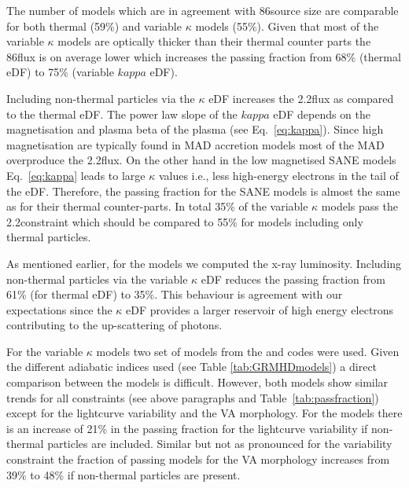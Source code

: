 
The number of models which are in agreement with 86\GHz source size are comparable for both thermal (59\%) and variable $\kappa$ models (55\%).
Given that most of the variable $\kappa$ models are optically thicker than their thermal counter parts the 86\GHz flux is on average lower which increases the passing fraction from 68\% (thermal eDF) to 75\% (variable $kappa$ eDF).


Including non-thermal particles via the $\kappa$ eDF increases the 2.2\um flux as compared to the thermal eDF.
The power law slope of the $kappa$ eDF depends on the magnetisation and plasma beta of the plasma (see Eq.~\ref{eq:kappa}).
Since high magnetisation are typically found in MAD accretion models most of the MAD overproduce the 2.2\um flux.
On the other hand in the low magnetised SANE models Eq.~\ref{eq:kappa} leads to large $\kappa$ values i.e., less high-energy electrons in the tail of the eDF.
Therefore, the passing fraction for the SANE models is almost the same as for their thermal counter-parts.
In total 35\% of the variable $\kappa$ models pass the 2.2\um constraint which should be compared to 55\% for models including only thermal particles.


As mentioned earlier, for the \hamr models we computed the x-ray luminosity.
Including non-thermal particles via the variable $\kappa$ eDF reduces the passing fraction from 61\% (for thermal eDF) to 35\%.
This behaviour is agreement with our expectations since the $\kappa$ eDF provides a larger reservoir of high energy electrons contributing to the up-scattering of photons.


For the variable $\kappa$ models two set of models from the \bhac and \hamr codes were used.
Given the different adiabatic indices used (see Table \ref{tab:GRMHDmodels}) a direct comparison between the models is difficult.
However, both models show similar trends for all constraints (see above paragraphs and Table~\ref{tab:passfraction}) except for the lightcurve variability and the VA morphology.
For the \hamr models there is an increase of 21\% in the passing fraction for the lightcurve variability if non-thermal particles are included.
Similar but not as pronounced for the variability constraint the fraction of passing models for the VA morphology increases from 39\% to 48\% if non-thermal particles are present.

